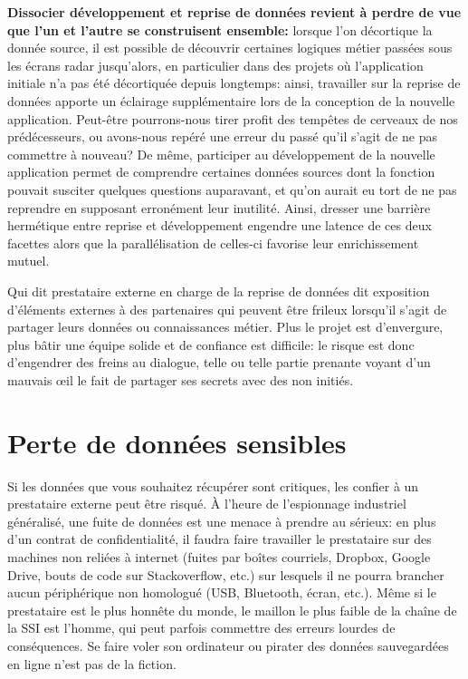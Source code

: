 \documentclass{book}
\begin{document}
\textbf{Dissocier développement et reprise de données revient à perdre de vue que l'un et l'autre se construisent ensemble:} lorsque l'on décortique la donnée source, il est possible de découvrir certaines logiques métier passées sous les écrans radar jusqu'alors, en particulier dans des projets où l'application initiale n'a pas été décortiquée depuis longtemps: ainsi, travailler sur la reprise de données apporte un éclairage supplémentaire lors de la conception de la nouvelle application. Peut-être pourrons-nous tirer profit des tempêtes de cerveaux de nos prédécesseurs, ou avons-nous repéré une erreur du passé qu'il s'agit de ne pas commettre à nouveau? De même, participer au développement de la nouvelle application permet de comprendre certaines données sources dont la fonction pouvait susciter quelques questions auparavant, et qu'on aurait eu tort de ne pas reprendre en supposant erronément leur inutilité. Ainsi, dresser une barrière hermétique entre reprise et développement engendre une latence de ces deux facettes alors que la parallélisation de celles-ci favorise leur enrichissement mutuel.

Qui dit prestataire externe en charge de la reprise de données dit exposition d'éléments externes à des partenaires qui peuvent être frileux lorsqu'il s'agit de partager leurs données ou connaissances métier. Plus le projet est d'envergure, plus bâtir une équipe solide et de confiance est difficile: le risque est donc d'engendrer des freins au dialogue, telle ou telle partie prenante voyant d'un mauvais œil le fait de partager ses secrets avec des non initiés.

\section{Perte de données sensibles}

Si les données que vous souhaitez récupérer sont critiques, les confier à un prestataire externe peut être risqué. À l'heure de l'espionnage industriel généralisé, une fuite de données est une menace à prendre au sérieux: en plus d'un contrat de confidentialité, il faudra faire travailler le prestataire sur des machines non reliées à internet (fuites par boîtes courriels, Dropbox, Google Drive, bouts de code sur Stackoverflow, etc.) sur lesquels il ne pourra brancher aucun périphérique non homologué (USB, Bluetooth, écran, etc.). Même si le prestataire est le plus honnête du monde, le maillon le plus faible de la chaîne de la SSI est l'homme, qui peut parfois commettre des erreurs lourdes de conséquences. Se faire voler son ordinateur ou pirater des données sauvegardées en ligne n'est pas de la fiction.
\end{document}
